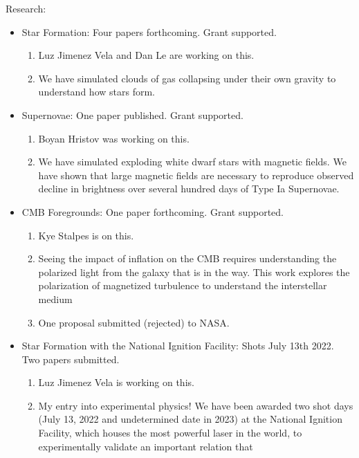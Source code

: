 \noindent
Research:
\begin{itemize}
	\item Star Formation: Four papers forthcoming.  Grant supported.
        \begin{enumerate}
            \item Luz Jimenez Vela and Dan Le are working on this.
            \item We have simulated clouds of gas collapsing under their own
                gravity to understand how stars form.          \end{enumerate}
	\item Supernovae: One paper published.   Grant supported.
        \begin{enumerate}
            \item Boyan Hristov was working on this.
            \item We have simulated exploding white dwarf stars with magnetic
                fields.  We have shown that large magnetic fields are necessary
                to reproduce observed decline in brightness over several hundred
                days of Type Ia Supernovae.
        \end{enumerate}
	\item CMB Foregrounds: One paper forthcoming.  Grant supported.
        \begin{enumerate}
            \item Kye Stalpes is on this.
            \item Seeing the impact of inflation on the CMB requires
                understanding the polarized light from the galaxy that is in the
                way.  This work explores the polarization of magnetized
                turbulence to understand the interstellar medium
            \item One proposal submitted (rejected) to NASA.
        \end{enumerate}
    \item Star Formation with the National Ignition Facility: Shots July 13th
        2022.
        Two papers submitted.  
        \begin{enumerate}
            \item Luz Jimenez Vela is working on this.
            \item My entry into experimental physics!  We have been awarded two
                shot days (July 13, 2022 and undetermined date in 2023) at the
                National Ignition Facility, which houses the most powerful laser
                in the world, to experimentally validate an important relation that

\end{enumerate}
\end{itemize}
